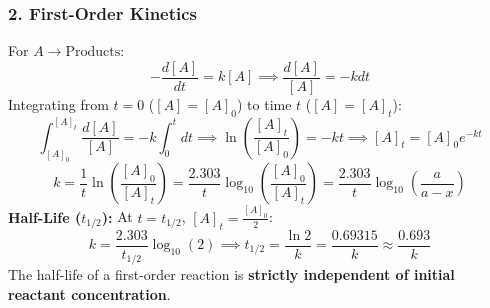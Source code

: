 \documentclass[10pt,twoside,openright]{book}
\begin{document}
\subsubsection{2. First-Order Kinetics}
For $A \to \text{Products}$:
\begin{equation}
  -\frac{d[A]}{dt} = k [A] \implies \frac{d[A]}{[A]} = -k dt
\end{equation}
Integrating from $t = 0$ ($[A] = [A]_0$) to time $t$ ($[A] = [A]_t$):
\begin{equation}
  \int_{[A]_0}^{[A]_t} \frac{d[A]}{[A]} = -k \int_0^t dt \implies \ln\left(\frac{[A]_t}{[A]_0}\right) = -kt \implies [A]_t = [A]_0 e^{-kt}
\end{equation}
\begin{equation}
  k = \frac{1}{t}\ln\left(\frac{[A]_0}{[A]_t}\right) = \frac{2.303}{t}\log_{10}\left(\frac{[A]_0}{[A]_t}\right) = \frac{2.303}{t}\log_{10}\left(\frac{a}{a - x}\right)
\end{equation}
\textbf{Half-Life ($t_{1/2}$):}
At $t = t_{1/2}$, $[A]_t = \frac{[A]_0}{2}$:
\begin{equation}
  k = \frac{2.303}{t_{1/2}}\log_{10}(2) \implies t_{1/2} = \frac{\ln 2}{k} = \frac{0.69315}{k} \approx \frac{0.693}{k}
\end{equation}
The half-life of a first-order reaction is \textbf{strictly independent of initial reactant concentration}.
\end{document}
